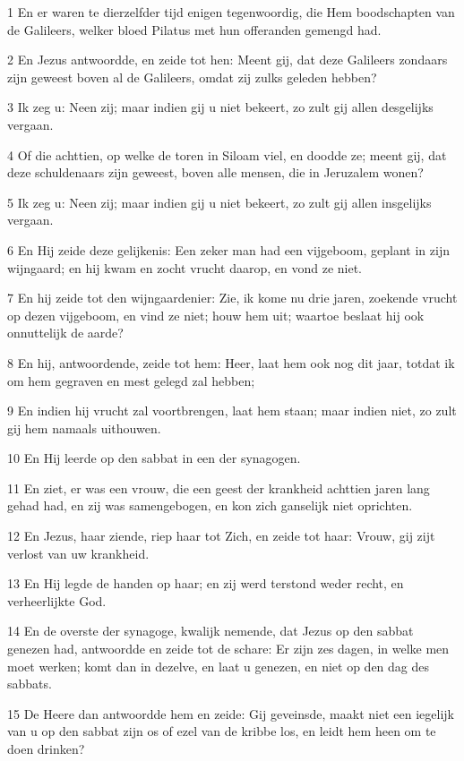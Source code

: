 \par 1 En er waren te dierzelfder tijd enigen tegenwoordig, die Hem boodschapten van de Galileers, welker bloed Pilatus met hun offeranden gemengd had.
\par 2 En Jezus antwoordde, en zeide tot hen: Meent gij, dat deze Galileers zondaars zijn geweest boven al de Galileers, omdat zij zulks geleden hebben?
\par 3 Ik zeg u: Neen zij; maar indien gij u niet bekeert, zo zult gij allen desgelijks vergaan.
\par 4 Of die achttien, op welke de toren in Siloam viel, en doodde ze; meent gij, dat deze schuldenaars zijn geweest, boven alle mensen, die in Jeruzalem wonen?
\par 5 Ik zeg u: Neen zij; maar indien gij u niet bekeert, zo zult gij allen insgelijks vergaan.
\par 6 En Hij zeide deze gelijkenis: Een zeker man had een vijgeboom, geplant in zijn wijngaard; en hij kwam en zocht vrucht daarop, en vond ze niet.
\par 7 En hij zeide tot den wijngaardenier: Zie, ik kome nu drie jaren, zoekende vrucht op dezen vijgeboom, en vind ze niet; houw hem uit; waartoe beslaat hij ook onnuttelijk de aarde?
\par 8 En hij, antwoordende, zeide tot hem: Heer, laat hem ook nog dit jaar, totdat ik om hem gegraven en mest gelegd zal hebben;
\par 9 En indien hij vrucht zal voortbrengen, laat hem staan; maar indien niet, zo zult gij hem namaals uithouwen.
\par 10 En Hij leerde op den sabbat in een der synagogen.
\par 11 En ziet, er was een vrouw, die een geest der krankheid achttien jaren lang gehad had, en zij was samengebogen, en kon zich ganselijk niet oprichten.
\par 12 En Jezus, haar ziende, riep haar tot Zich, en zeide tot haar: Vrouw, gij zijt verlost van uw krankheid.
\par 13 En Hij legde de handen op haar; en zij werd terstond weder recht, en verheerlijkte God.
\par 14 En de overste der synagoge, kwalijk nemende, dat Jezus op den sabbat genezen had, antwoordde en zeide tot de schare: Er zijn zes dagen, in welke men moet werken; komt dan in dezelve, en laat u genezen, en niet op den dag des sabbats.
\par 15 De Heere dan antwoordde hem en zeide: Gij geveinsde, maakt niet een iegelijk van u op den sabbat zijn os of ezel van de kribbe los, en leidt hem heen om te doen drinken?
